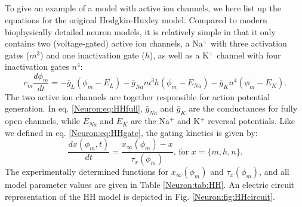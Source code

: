 \subsection{}
\label{sec:Neuron:HH}
To give an example of a model with active ion channels, we here list up the equations for the original Hodgkin-Huxley model. Compared to modern biophysically detailed neuron models, it is relatively simple in that it only contains two (voltage-gated) active ion channels, a Na$^+$ with three activation gates ($m^3$) and one inactivation gate ($h$), as well as a K$^+$ channel with four inactivation gates $n^4$:
\begin{equation}
c_m \frac{d\phi_m}{dt} = -\bar{g}_L(\phi_m-E_L) - \bar{g}_{Na} m^3 h (\phi_m - E_{Na}) - \bar{g}_{K} n^4 (\phi_m - E_{K}).
\label{Neuron:eq:HHfull}
\end{equation}
The two active ion channels are together responsible for action potential generation. In eq. \ref{Neuron:eq:HHfull}, $\bar{g}_{Na}$ and $\bar{g}_K$ are the conductances for fully open channels, while $E_{Na}$ and $E_{K}$ are the Na$^+$ and K$^+$ reversal potentials. Like we defined in eq. \ref{Neuron:eq:HHgate}, the gating kinetics is given by: 
\begin{equation}
\frac{dx(\phi_m,t)}{dt} = \frac{x_{\infty}(\phi_m) - x}{\tau_x(\phi_m)},  \, \text{for } x = \{m,h,n\}.
\label{Neuron:eq:HHgates}
\end{equation}
The experimentally determined functions for $x_{\infty}(\phi_m)$ and $\tau_x(\phi_m)$, and all model parameter values are given in Table \ref{Neuron:tab:HH}. An electric circuit representation of the HH model is depicted in Fig. \ref{Neuron:fig:HHcircuit}.

